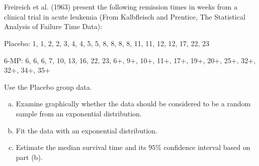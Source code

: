 \documentclass{elegantbook}
\begin{document}

\setcounter{chapter}{8}
\chapter{}

    Freireich et al. (1963) present the following remission times in weeks from a clinical trial in acute leukemia (From Kalbfleisch and Prentice, The Statistical Analysis of Failure Time Data):

    Placebo: 1, 1, 2, 2, 3, 4, 4, 5, 5, 8, 8, 8, 8, 11, 11, 12, 12, 17, 22, 23

    6-MP: 6, 6, 6, 7, 10, 13, 16, 22, 23, 6+, 9+, 10+, 11+, 17+, 19+, 20+, 25+, 32+, 32+, 34+, 35+

\begin{exercise*}[1]
    Use the Placebo group data.
    \begin{enumerate}[(a)]
        \item Examine graphically whether the data should be considered to be a random sample from an exponential distribution.
        \item Fit the data with an exponential distribution.
        \item Estimate the median survival time and its $95\%$ confidence interval based on part (b).
    \end{enumerate}
\end{exercise*}
\end{document}
